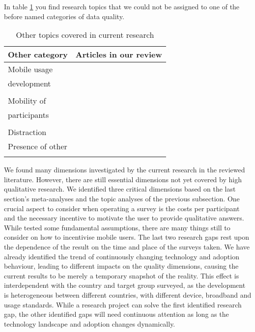 In table \ref{tab: other} you find research topics that we could not be assigned to one of the before named categories of data quality.

\begin{table}
    \centering
    \begin{tabular}{ll}
        \toprule
        Other category & Articles in our review\\
        \midrule
        Mobile usage & \cite{revilla_online_2016, gummer_does_2019}\\
        development & \cite{de_bruijne_mobile_2014, wells_what_2015}\\
        & \cite{wenz_willingness_2019}\\
        Mobility of & \cite{de_bruijne_comparing_2013, mavletova_data_2013}\\
        participants & \cite{antoun_effects_2017, mavletova_sensitive_2013}\\
        & \cite{toninelli_smartphones_2016}\\
        Distraction & \cite{antoun_effects_2017, toninelli_smartphones_2016}\\
        Presence of other & \cite{antoun_effects_2017, mavletova_sensitive_2013}\\
        & \cite{toninelli_smartphones_2016}\\
        \bottomrule
    \end{tabular}
    \caption{Other topics covered in current research}
    \label{tab: other}
\end{table}

We found many dimensions investigated by the current research in the reviewed literature. However, there are still essential dimensions not yet covered by high qualitative research. We identified three critical dimensions based on the last section's meta-analyses and the topic analyses of the previous subsection. One crucial aspect to consider when operating a survey is the costs per participant and the necessary incentive to motivate the user to provide qualitative answers. While \cite{mavletova_device_2016} tested some fundamental assumptions, there are many things still to consider on how to incentivise mobile users. The last two research gaps rest upon the dependence of the result on the time and place of the surveys taken. We have already identified the trend of continuously changing technology and adoption behaviour, leading to different impacts on the quality dimensions, causing the current results to be merely a temporary snapshot of the reality. This effect is interdependent with the country and target group surveyed, as the development is heterogeneous between different countries, with different device, broadband and usage standards. While a research project can solve the first identified research gap, the other identified gaps will need continuous attention as long as the technology landscape and adoption changes dynamically. 


